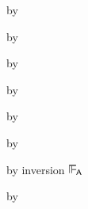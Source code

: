 {\begin{lamportproof*}
    \begin{pfproof}
      \qedstep
        \begin{pfproof}
          by \pfih
        \end{pfproof}
    \end{pfproof}

    \begin{pfproof}
      \qedstep
        \begin{pfproof}
          by \pfih
        \end{pfproof}
    \end{pfproof}

    \begin{pfproof}
      \qedstep
        \begin{pfproof}
          by \pfih
        \end{pfproof}
    \end{pfproof}

    \begin{pfproof}
      \qedstep
        \begin{pfproof}
          by \pfih
        \end{pfproof}
    \end{pfproof}

    \begin{pfproof}
      \qedstep
        \begin{pfproof}
          by \pfih
        \end{pfproof}
    \end{pfproof}

    \begin{pfproof}
      \qedstep
        \begin{pfproof}
          by \pfih
        \end{pfproof}
    \end{pfproof}

    \begin{pfproof}
        \begin{pfproof}
          by inversion $\sWLA$
        \end{pfproof}
      \qedstep
        \begin{pfproof}
          by \pfih
        \end{pfproof}
    \end{pfproof}


\end{lamportproof*}}
